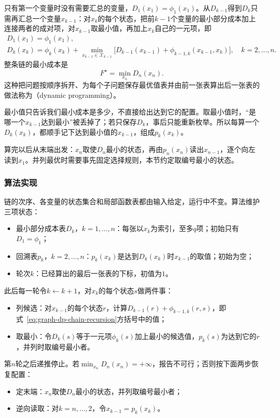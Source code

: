 只有第一个变量时没有需要汇总的变量，$D_1(x_1)=\phi_1(x_1)$。从$D_{k-1}$得到$D_k$只需再汇总一个变量$x_{k-1}$：对$x_k$的每个状态，把前$k-1$个变量的最小部分成本加上连接两者的成对项，对$x_{k-1}$取最小值，再加上$x_k$自己的一元项，即
\begin{equation}
\begin{gathered}
D_1(x_1)=\phi_1(x_1),\\
D_k(x_k)=\phi_k(x_k)+\min_{x_{k-1}\in\mathcal X_{k-1}}\bigl[D_{k-1}(x_{k-1})+\phi_{k-1,k}(x_{k-1},x_k)\bigr],\quad k=2,\ldots,n.
\end{gathered}
\label{eq:graph-dp-chain-recursion}
\end{equation}
整条链的最小成本是
\[
F^\star=\min_{x_n}D_n(x_n).
\]
这种把问题按顺序拆开、为每个子问题保存最优值表并由前一张表算出后一张表的做法称为（dynamic programming）。

最小值只告诉我们最小成本是多少，不直接给出达到它的配置。取最小值时，“是哪一个$x_{k-1}$达到最小”被丢掉了；若只保存$D_k$，事后只能重新枚举。所以每算一个$D_k(x_k)$，都顺手记下达到最小值的$x_{k-1}$，组成$p_k(x_k)$。

算完以后从末端出发：$x_n$取使$D_n$最小的状态，再由$p_n(x_n)$读出$x_{n-1}$，逐个向左读到$x_1$。并列最优时需要事先固定选择规则，本节约定取编号最小的状态。

\subsubsection{算法实现}

链的次序、各变量的状态集合和局部函数表都由输入给定，运行中不变。算法维护三项状态：
\begin{itemize}
  \item 最小部分成本表$D_k$，$k=1,\ldots,n$：每张以$x_k$为索引，至多$q$项；初始只有$D_1=\phi_1$；
  \item 回溯表$p_k$，$k=2,\ldots,n$：$p_k(x_k)$是达到$D_k(x_k)$时$x_{k-1}$的取值；初始为空；
  \item 轮次$k$：已经算出的最后一张表的下标，初值为$1$。
\end{itemize}
此后每一轮令$k\gets k+1$，对$x_k$的每个状态$s$做两件事：
\begin{itemize}
  \item 列候选：对$x_{k-1}$的每个状态$r$，计算$D_{k-1}(r)+\phi_{k-1,k}(r,s)$，即式~\eqref{eq:graph-dp-chain-recursion}方括号中的值；
  \item 取最小：令$D_k(s)$等于一元项$\phi_k(s)$加上最小的候选值，$p_k(s)$为达到它的$r$，并列时取编号最小者。
\end{itemize}
第$n$轮之后递推停止。若$\min_{x_n}D_n(x_n)=+\infty$，报告不可行；否则按下面两步恢复配置：
\begin{itemize}
  \item 定末端：$x_n$取使$D_n$最小的状态，并列取编号最小者；
  \item 逆向读取：对$k=n,\ldots,2$，令$x_{k-1}=p_k(x_k)$。
\end{itemize}

